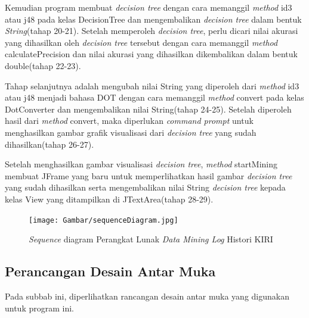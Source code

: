 Kemudian program membuat \textsl{decision tree} dengan cara memanggil \textsl{method} id3 atau j48 pada kelas DecisionTree dan mengembalikan \textsl{decision tree} dalam bentuk \textsl{String}(tahap 20-21). Setelah memperoleh \textsl{decision tree}, perlu dicari nilai akurasi yang dihasilkan oleh \textsl{decision tree} tersebut dengan cara memanggil \textsl{method} calculatePrecision dan nilai akurasi yang dihasilkan dikembalikan dalam bentuk double(tahap 22-23).

Tahap selanjutnya adalah mengubah nilai String yang diperoleh dari \textsl{method} id3 atau j48 menjadi bahasa DOT dengan cara memanggil \textsl{method} convert pada kelas DotConverter dan mengembalikan nilai String(tahap 24-25). Setelah diperoleh hasil dari \textsl{method} convert, maka diperlukan \textsl{command prompt} untuk menghasilkan gambar grafik visualisasi dari \textsl{decision tree} yang sudah dihasilkan(tahap 26-27).

Setelah menghasilkan gambar visualisasi \textsl{decision tree}, \textsl{method} startMining membuat JFrame yang baru untuk memperlihatkan hasil gambar \textsl{decision tree} yang sudah dihasilkan serta mengembalikan nilai String \textsl{decision tree} kepada kelas View yang ditampilkan di JTextArea(tahap 28-29).


\begin{figure}[ht]
\texttt{[image: Gambar/sequenceDiagram.jpg]}
\caption[\textsl{Sequence} Diagram Perangkat Lunak \textsl{Data Mining Log} Histori KIRI]{\textsl{Sequence} diagram Perangkat Lunak \textsl{Data Mining Log} Histori KIRI} 
\label{fig:sequenceDiagram}
\end{figure}

\subsection{Perancangan Desain Antar Muka}

Pada subbab ini, diperlihatkan rancangan desain antar muka yang digunakan untuk program ini.

